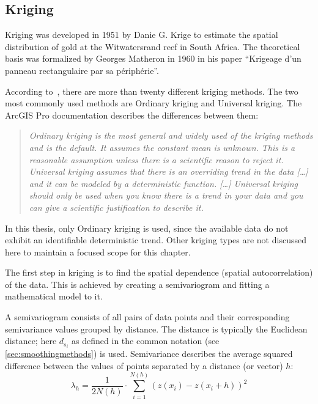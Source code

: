 \subsection{Kriging}\label{subsec:kriging}

Kriging was developed in 1951 by Danie G. Krige to estimate the spatial distribution of gold at the Witwatersrand reef in South Africa. The theoretical basis was formalized by Georges Matheron in 1960 in his paper ``Krigeage d'un panneau rectangulaire par sa périphérie''.\ \cite{kriging:invention, kriging:invention2}

According to\ \cite{shape:book01}, there are more than twenty different kriging methods. The two most commonly used methods are Ordinary kriging and Universal kriging. The ArcGIS Pro documentation describes the differences between them:

\begin{quote}
    \textit{Ordinary kriging is the most general and widely used of the kriging methods and is the default. It assumes the constant mean is unknown. This is a reasonable assumption unless there is a scientific reason to reject it.\\Universal kriging assumes that there is an overriding trend in the data [\ldots] and it can be modeled by a deterministic function. [\ldots] Universal kriging should only be used when you know there is a trend in your data and you can give a scientific justification to describe it.}\ \cite{kriging:web01}
\end{quote}

In this thesis, only Ordinary kriging is used, since the available data do not exhibit an identifiable deterministic trend. Other kriging types are not discussed here to maintain a focused scope for this chapter.

The first step in kriging is to find the spatial dependence (spatial autocorrelation) of the data. This is achieved by creating a semivariogram and fitting a mathematical model to it.

A semivariogram consists of all pairs of data points and their corresponding semivariance values grouped by distance. The distance is typically the Euclidean distance; here $d_{s_i}$ as defined in the common notation (see \autoref{sec:smoothingmethods}) is used. Semivariance describes the average squared difference between the values of points separated by a distance (or vector) $h$:
\[
\lambda_h=\frac{1}{2N(h)}\cdot\sum_{i=1}^{N(h)}{\left(z(x_i)-z(x_i+h)\right)}^2
\]


